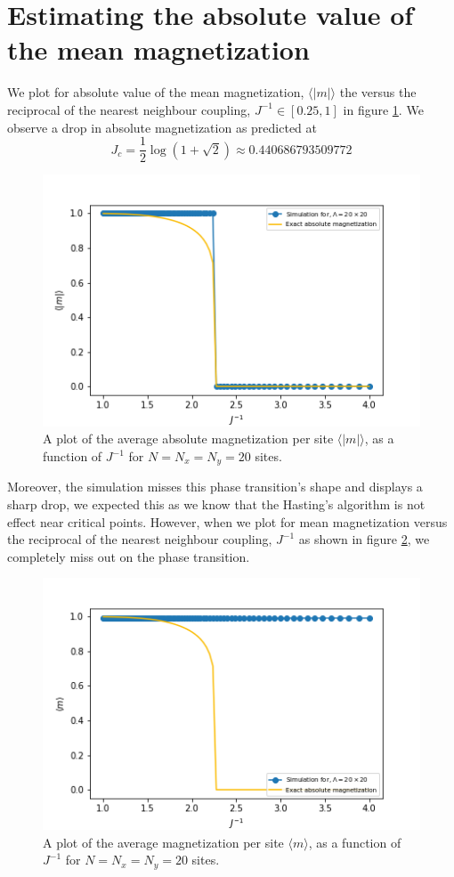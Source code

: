 \documentclass{cernatsnote}
\begin{document}
\section{Estimating the absolute value of the mean magnetization}
We plot for absolute value of the mean magnetization, $\langle | m | \rangle$ the versus the reciprocal of the nearest neighbour coupling, $J^{-1} \in [0.25,1]$ in figure \ref{fig:abs_mag}. We observe a drop in absolute magnetization as predicted at
\begin{equation}
    J_c=\frac{1}{2} \log (1+\sqrt{2}) \approx 0.440686793509772
\end{equation}
\begin{figure}[H]
    \centering
    \includegraphics[scale = 0.6]{images/abs_m_v_J_20.png}
    \caption{A plot of the average absolute magnetization per site $\langle | m | \rangle$, as a function of $J^{-1}$ for $N = N_{x} = N_{y} = 20$ sites.}
    \label{fig:abs_mag}
\end{figure}
Moreover, the simulation misses this phase transition's shape and displays a sharp drop, we expected this as we know that the Hasting's algorithm is not effect near critical points.
However, when we plot for mean magnetization versus the reciprocal of the nearest neighbour coupling, $J^{-1}$ as shown in figure \ref{fig:mag_v_j}, we completely miss out on the phase transition.
\begin{figure}[H]
    \centering
    \includegraphics[scale = 0.6]{images/m_v_j_20.png}
    \caption{A plot of the average magnetization per site $\langle m \rangle$, as a function of $J^{-1}$ for $N = N_{x} = N_{y} = 20$ sites.}
    \label{fig:mag_v_j}
\end{figure}
\end{document}
